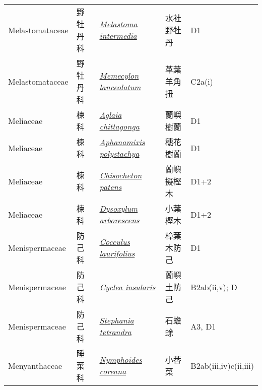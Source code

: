 {\begin{longtable}{p{2.5cm}p{2cm}p{5cm}p{2.5cm}p{3cm}}
    Melastomataceae & 野牡丹科 & \href{http://www.theplantlist.org/tpl1.1/search?q=Melastoma+intermedia}{\textit{Melastoma intermedia} } & 水社野牡丹 & D1 \index{Melastoma@\textit{Melastoma}!intermedia@\textit{intermedia}}  \index{水社野牡丹} \\
    Melastomataceae & 野牡丹科 & \href{http://www.theplantlist.org/tpl1.1/search?q=Memecylon+lanceolatum}{\textit{Memecylon lanceolatum} } & 革葉羊角扭 & C2a(i) \index{Memecylon@\textit{Memecylon}!lanceolatum@\textit{lanceolatum}}  \index{革葉羊角扭} \\
    Meliaceae & 楝科 & \href{http://www.theplantlist.org/tpl1.1/search?q=Aglaia+chittagonga}{\textit{Aglaia chittagonga} } & 蘭嶼樹蘭 & D1 \index{Aglaia@\textit{Aglaia}!chittagonga@\textit{chittagonga}}  \index{蘭嶼樹蘭} \\
    Meliaceae & 楝科 & \href{http://www.theplantlist.org/tpl1.1/search?q=Aphanamixis+polystachya}{\textit{Aphanamixis polystachya} } & 穗花樹蘭 & D1 \index{Aphanamixis@\textit{Aphanamixis}!polystachya@\textit{polystachya}}  \index{穗花樹蘭} \\
    Meliaceae & 楝科 & \href{http://www.theplantlist.org/tpl1.1/search?q=Chisocheton+patens}{\textit{Chisocheton patens} } & 蘭嶼擬樫木 & D1+2 \index{Chisocheton@\textit{Chisocheton}!patens@\textit{patens}}  \index{蘭嶼擬樫木} \\
    Meliaceae & 楝科 & \href{http://www.theplantlist.org/tpl1.1/search?q=Dysoxylum+arborescens}{\textit{Dysoxylum arborescens} } & 小葉樫木 & D1+2 \index{Dysoxylum@\textit{Dysoxylum}!arborescens@\textit{arborescens}}  \index{小葉樫木} \\
    Menispermaceae & 防己科 & \href{http://www.theplantlist.org/tpl1.1/search?q=Cocculus+laurifolius}{\textit{Cocculus laurifolius} } & 樟葉木防己 & D1 \index{Cocculus@\textit{Cocculus}!laurifolius@\textit{laurifolius}}  \index{樟葉木防己} \\
    Menispermaceae & 防己科 & \href{http://www.theplantlist.org/tpl1.1/search?q=Cyclea+insularis}{\textit{Cyclea insularis} } & 蘭嶼土防己 & B2ab(ii,v); D \index{Cyclea@\textit{Cyclea}!insularis@\textit{insularis}}  \index{蘭嶼土防己} \\
    Menispermaceae & 防己科 & \href{http://www.theplantlist.org/tpl1.1/search?q=Stephania+tetrandra}{\textit{Stephania tetrandra} } & 石蟾蜍 & A3, D1 \index{Stephania@\textit{Stephania}!tetrandra@\textit{tetrandra}}  \index{石蟾蜍} \\
    Menyanthaceae & 睡菜科 & \href{http://www.theplantlist.org/tpl1.1/search?q=Nymphoides+coreana}{\textit{Nymphoides coreana} } & 小莕菜 & B2ab(iii,iv)c(ii,iii) \index{Nymphoides@\textit{Nymphoides}!coreana@\textit{coreana}}  \index{小莕菜} \\

\end{longtable}}
